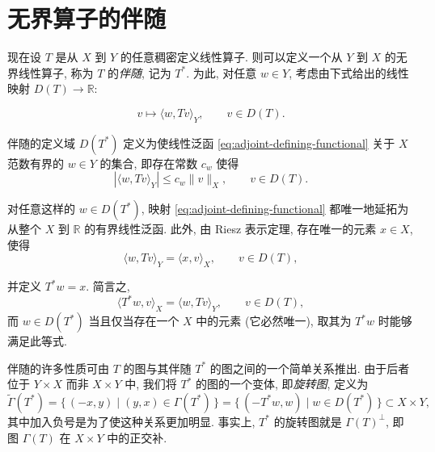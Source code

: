 \section{{无界算子的伴随}}\label{sec:unbounded-adjoint}

{现在设 $T$ 是从 $X$ 到 $Y$ 的任意稠密定义线性算子. 则可以定义一个从 $Y$ 到 $X$ 的无界线性算子, 称为 $T$ 的\emph{伴随}, 记为 $T^*$. 为此, 对任意 $w\in Y$, 考虑由下式给出的线性映射 $D(T)\to\mathbb R$:}

\begin{equation}\label{eq:adjoint-defining-functional}
v\mapsto\langle w,Tv\rangle_Y,\qquad v\in D(T).
\end{equation}

{伴随的定义域 $D(T^*)$ 定义为使线性泛函 \eqref{eq:adjoint-defining-functional} 关于 $X$ 范数有界的 $w\in Y$ 的集合, 即存在常数 $c_w$ 使得}
\[
|\langle w,Tv\rangle_Y|\leq c_w\|v\|_X,\qquad v\in D(T).
\]

{对任意这样的 $w\in D(T^*)$, 映射 \eqref{eq:adjoint-defining-functional} 都唯一地延拓为从整个 $X$ 到 $\mathbb R$ 的有界线性泛函. 此外, 由 Riesz 表示定理, 存在唯一的元素 $x\in X$, 使得}
\begin{equation}\label{eq:adjoint-riesz-identity}
\langle w,Tv\rangle_Y=\langle x,v\rangle_X,\qquad v\in D(T),
\end{equation}

{并定义 $T^*w=x$. 简言之,}
\[
\langle T^*w,v\rangle_X=\langle w,Tv\rangle_Y,\qquad v\in D(T),
\]
{而 $w\in D(T^*)$ 当且仅当存在一个 $X$ 中的元素 (它必然唯一), 取其为 $T^*w$ 时能够满足此等式.}

{伴随的许多性质可由 $T$ 的图与其伴随 $T^*$ 的图之间的一个简单关系推出. 由于后者位于 $Y\times X$ 而非 $X\times Y$ 中, 我们将 $T^*$ 的图的一个变体, 即\emph{旋转图}, 定义为}
\[
\widetilde\Gamma(T^*)=\{\,(-x,y)\mid(y,x)\in\Gamma(T^*)\,\}=\{\,(-T^*w,w)\mid w\in D(T^*)\,\}\subset X\times Y,
\]
{其中加入负号是为了使这种关系更加明显. 事实上, $T^*$ 的旋转图就是 $\Gamma(T)^\perp$, 即图 $\Gamma(T)$ 在 $X\times Y$ 中的正交补.}


